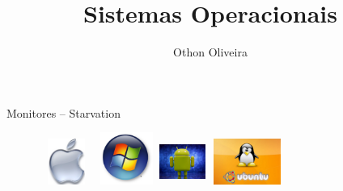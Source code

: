 \documentclass[11pt]{beamer}
\author{Othon Oliveira}
\title{Sistemas Operacionais}
\institute{Fatec -- Faculdade de Informática --- PE}
\begin{document}
\newcommand{\capa}{
    \begin{tikzpicture}[remember picture,overlay]
        \node at (current page.south west)
            {\begin{tikzpicture}[remember picture, overlay]
                \fill[shading=radial,top color=orange,bottom color=orange,middle color=yellow] (0,0) rectangle (\paperwidth,\paperheight);
            \end{tikzpicture}
          };
    \end{tikzpicture}
}




\begin{frame}
\titlepage
\end{frame}

\begin{frame}
\tableofcontents
\end{frame}

\begin{frame}{Monitores -- Starvation}
\begin{figure}[h]
\includegraphics[width=18mm, height=15mm]{Figuras/appleOficial.jpg}
\qquad \quad \quad \quad \quad
\includegraphics[width=19mm, height=17mm]{Figuras/windows.png}
\qquad \quad \quad \quad \quad \quad \quad 	\vspace{1.0in}
\includegraphics[width=15mm, height=15mm]{Figuras/android.jpg}
\qquad \quad \quad \quad \quad \quad \quad \quad 
\includegraphics[width=25mm, height=15mm]{Figuras/ubuntu_904.jpg}

\end{figure}
\end{frame}
\end{document}
